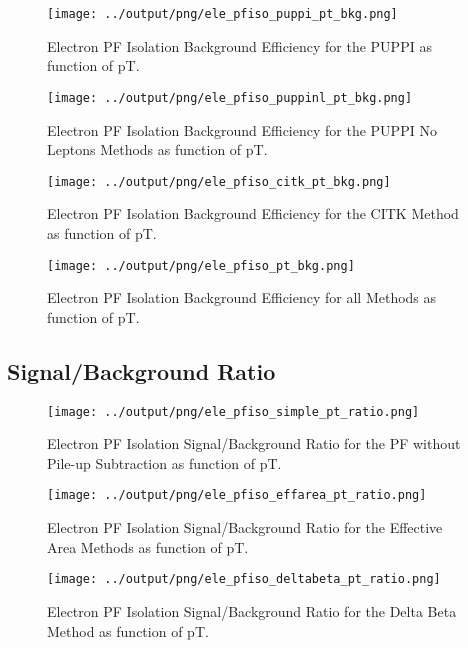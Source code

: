\documentclass[11pt]{book}
\begin{document}
\begin{figure}[htb]
\centering
\texttt{[image: ../output/png/ele\_pfiso\_puppi\_pt\_bkg.png]}
\caption{Electron PF Isolation Background Efficiency for the PUPPI as function of pT.}
\label{fig:ele_pfiso_pt_bkg_puppi}
\end{figure}

\begin{figure}[htb]
\centering
\texttt{[image: ../output/png/ele\_pfiso\_puppinl\_pt\_bkg.png]}
\caption{Electron PF Isolation Background Efficiency for the PUPPI No Leptons Methods as function of pT.}
\label{fig:ele_pfiso_pt_bkg_puppinl}
\end{figure}

\begin{figure}[htb]
\centering
\texttt{[image: ../output/png/ele\_pfiso\_citk\_pt\_bkg.png]}
\caption{Electron PF Isolation Background Efficiency for the CITK Method as function of pT.}
\label{fig:ele_pfiso_pt_bkg_citk}
\end{figure}

\begin{figure}[htb]
\centering
\texttt{[image: ../output/png/ele\_pfiso\_pt\_bkg.png]}
\caption{Electron PF Isolation Background Efficiency for all Methods as function of pT.}
\label{fig:ele_pfiso_pt_bkg}
\end{figure}
\clearpage


\subsection{Signal/Background Ratio}
\begin{figure}[htb]
\centering
\texttt{[image: ../output/png/ele\_pfiso\_simple\_pt\_ratio.png]}
\caption{Electron PF Isolation Signal/Background Ratio for the PF without Pile-up Subtraction as function of pT.}
\label{fig:ele_pfiso_pt_ratio_simple}
\end{figure}

\begin{figure}[htb]
\centering
\texttt{[image: ../output/png/ele\_pfiso\_effarea\_pt\_ratio.png]}
\caption{Electron PF Isolation Signal/Background Ratio for the Effective Area Methods as function of pT.}
\label{fig:ele_pfiso_pt_ratio_effarea}
\end{figure}

\begin{figure}[htb]
\centering
\texttt{[image: ../output/png/ele\_pfiso\_deltabeta\_pt\_ratio.png]}
\caption{Electron PF Isolation Signal/Background Ratio for the Delta Beta Method as function of pT.}
\label{fig:ele_pfiso_pt_ratio_deltabeta}
\end{figure}
\end{document}

